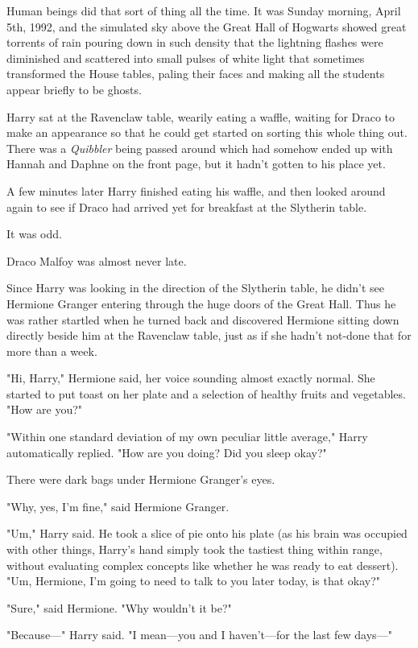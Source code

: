 Human beings did that sort of thing all the time.
\sbreak
It was Sunday morning, April 5th, 1992, and the simulated sky above
the Great Hall of Hogwarts showed great torrents of rain pouring down in such
density that the lightning flashes were diminished and scattered into small
pulses of white light that sometimes transformed the House tables, paling their
faces and making all the students appear briefly to be ghosts.

Harry sat at the Ravenclaw table, wearily eating a waffle, waiting for Draco to
make an appearance so that he could get started on sorting this whole thing
out. There was a \emph{Quibbler} being passed around which had somehow ended up
with Hannah and Daphne on the front page, but it hadn't gotten to his place yet.

A few minutes later Harry finished eating his waffle, and then looked around
again to see if Draco had arrived yet for breakfast at the Slytherin table.

It was odd.

Draco Malfoy was almost never late.

Since Harry was looking in the direction of the Slytherin table, he didn't see
Hermione Granger entering through the huge doors of the Great Hall. Thus he was
rather startled when he turned back and discovered Hermione sitting down
directly beside him at the Ravenclaw table, just as if she hadn't not-done that
for more than a week.

"Hi, Harry," Hermione said, her voice sounding almost exactly normal. She
started to put toast on her plate and a selection of healthy fruits and
vegetables. "How are you?"

"Within one standard deviation of my own peculiar little average," Harry
automatically replied. "How are you doing? Did you sleep okay?"

There were dark bags under Hermione Granger's eyes.

"Why, yes, I'm fine," said Hermione Granger.

"Um," Harry said. He took a slice of pie onto his plate (as his brain was
occupied with other things, Harry's hand simply took the tastiest thing within
range, without evaluating complex concepts like whether he was ready to eat
dessert). "Um, Hermione, I'm going to need to talk to you later today, is that
okay?"

"Sure," said Hermione. "Why wouldn't it be?"

"Because---" Harry said. "I mean---you and I haven't---for the last few days---"

